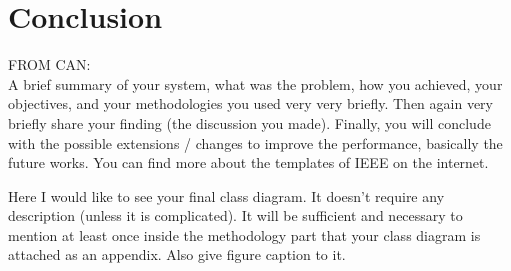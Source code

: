\documentclass[journal]{IEEEtran}
\begin{document}



\section{Conclusion}
FROM CAN:
\\
A brief summary of your system, what was the problem, how you achieved, your objectives, and your methodologies you used very very briefly. Then again very briefly share your finding (the discussion you made). Finally, you will conclude with the possible extensions / changes to improve the performance, basically the future works. You can find more about the templates of IEEE on the internet.





Here I would like to see your final class diagram. It doesn’t require any description (unless it is complicated). It will be sufficient and necessary to mention at least once inside the methodology part that your class diagram is attached as an appendix. Also give figure caption to it.



\end{document}
